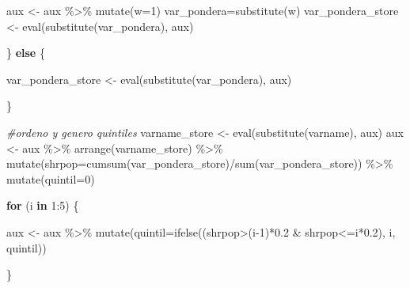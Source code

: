 \documentclass[
]{book}
\newenvironment{Shaded}{\begin{snugshade}}{\end{snugshade}}
\newcommand{\AttributeTok}[1]{\textcolor[rgb]{0.77,0.63,0.00}{#1}}
\newcommand{\CommentTok}[1]{\textcolor[rgb]{0.56,0.35,0.01}{\textit{#1}}}
\newcommand{\ControlFlowTok}[1]{\textcolor[rgb]{0.13,0.29,0.53}{\textbf{#1}}}
\newcommand{\DecValTok}[1]{\textcolor[rgb]{0.00,0.00,0.81}{#1}}
\newcommand{\FloatTok}[1]{\textcolor[rgb]{0.00,0.00,0.81}{#1}}
\newcommand{\FunctionTok}[1]{\textcolor[rgb]{0.00,0.00,0.00}{#1}}
\newcommand{\NormalTok}[1]{#1}
\newcommand{\OtherTok}[1]{\textcolor[rgb]{0.56,0.35,0.01}{#1}}
\newcommand{\SpecialCharTok}[1]{\textcolor[rgb]{0.00,0.00,0.00}{#1}}
\begin{document}
\begin{Shaded}
\begin{Highlighting}[numbers=left,,]
\NormalTok{      aux }\OtherTok{\textless{}{-}}\NormalTok{ aux }\SpecialCharTok{\%\textgreater{}\%} \FunctionTok{mutate}\NormalTok{(}\AttributeTok{w=}\DecValTok{1}\NormalTok{)}
\NormalTok{      var\_pondera}\OtherTok{=}\FunctionTok{substitute}\NormalTok{(w)}
\NormalTok{      var\_pondera\_store }\OtherTok{\textless{}{-}} \FunctionTok{eval}\NormalTok{(}\FunctionTok{substitute}\NormalTok{(var\_pondera), aux)}
      
\NormalTok{      \} }\ControlFlowTok{else}\NormalTok{ \{}
      
\NormalTok{      var\_pondera\_store }\OtherTok{\textless{}{-}} \FunctionTok{eval}\NormalTok{(}\FunctionTok{substitute}\NormalTok{(var\_pondera), aux)}
      
\NormalTok{    \}}
    
    
    
    \CommentTok{\#ordeno y genero quintiles}
\NormalTok{    varname\_store }\OtherTok{\textless{}{-}} \FunctionTok{eval}\NormalTok{(}\FunctionTok{substitute}\NormalTok{(varname), aux)}
\NormalTok{    aux }\OtherTok{\textless{}{-}}\NormalTok{ aux }\SpecialCharTok{\%\textgreater{}\%} \FunctionTok{arrange}\NormalTok{(varname\_store) }\SpecialCharTok{\%\textgreater{}\%}
                   \FunctionTok{mutate}\NormalTok{(}\AttributeTok{shrpop=}\FunctionTok{cumsum}\NormalTok{(var\_pondera\_store)}\SpecialCharTok{/}\FunctionTok{sum}\NormalTok{(var\_pondera\_store)) }\SpecialCharTok{\%\textgreater{}\%} 
                   \FunctionTok{mutate}\NormalTok{(}\AttributeTok{quintil=}\DecValTok{0}\NormalTok{)}
    
    \ControlFlowTok{for}\NormalTok{ (i }\ControlFlowTok{in} \DecValTok{1}\SpecialCharTok{:}\DecValTok{5}\NormalTok{) \{}
      
\NormalTok{     aux }\OtherTok{\textless{}{-}}\NormalTok{ aux }\SpecialCharTok{\%\textgreater{}\%} \FunctionTok{mutate}\NormalTok{(}\AttributeTok{quintil=}\FunctionTok{ifelse}\NormalTok{((shrpop}\SpecialCharTok{\textgreater{}}\NormalTok{(i}\DecValTok{{-}1}\NormalTok{)}\SpecialCharTok{*}\FloatTok{0.2} \SpecialCharTok{\&}\NormalTok{ shrpop}\SpecialCharTok{\textless{}=}\NormalTok{i}\SpecialCharTok{*}\FloatTok{0.2}\NormalTok{), i, quintil)) }
      
\NormalTok{    \}  }
    
    
    

\end{Highlighting}
\end{Shaded}
\end{document}
